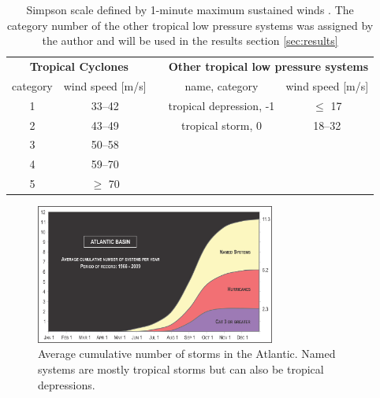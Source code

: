 \begingroup
\setlength{\tabcolsep}{10pt} %
\renewcommand{\arraystretch}{1.5} %
\begin{table}[ht]
	\centering
	\begin{tabular}{|c|c|c|c|c|}
		\cline{1-2} \cline{4-5}
		\multicolumn{2}{|c|}{\textbf{Tropical Cyclones}} &                      & \multicolumn{2}{c|}{\textbf{Other tropical low pressure systems}}                                                  \\ \cline{1-2} \cline{4-5}
		category                                         & wind speed {[}m/s{]} &                                                                   & name, category          & wind speed {[}m/s{]} \\ \cline{1-2} \cline{4-5}
		1                                                & 33--42               &                                                                   & tropical depression, -1 & $\leq$ 17            \\
		2                                                & 43--49               &                                                                   & tropical storm, 0       & 18--32               \\
		3                                                & 50--58               &                                                                   &                         &                      \\
		4                                                & 59--70               &                                                                   &                         &                      \\
		5                                                & $\geq$ 70            &                                                                   &                         &                      \\ \cline{1-2} \cline{4-5}
	\end{tabular}
	\caption{Simpson scale defined by 1-minute maximum sustained winds \cite{simpson}. The category number of the other tropical low pressure systems was assigned by the author and will be used in the results section \ref{sec:results}}
	\label{tab:simpson-scale}
\end{table}
\endgroup

\begin{figure}[ht]
	\centering
	\includegraphics[width=0.7\textwidth]{img/cum-average-cat.png}
	\caption{Average cumulative number of storms in the Atlantic. Named systems are mostly tropical storms but can also be tropical depressions.\cite{climatology}}
	\label{fig:cat-climatology}
\end{figure}

